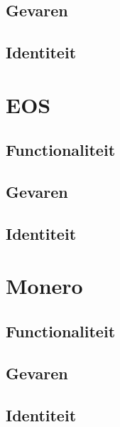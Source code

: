 \subsection{Gevaren}

\newpage
\subsection{Identiteit}


\newpage

\section{EOS}
\subsection{Functionaliteit}

\subsection{Gevaren}

\subsection{Identiteit}


\section{Monero}
\subsection{Functionaliteit}

\subsection{Gevaren}

\subsection{Identiteit}
